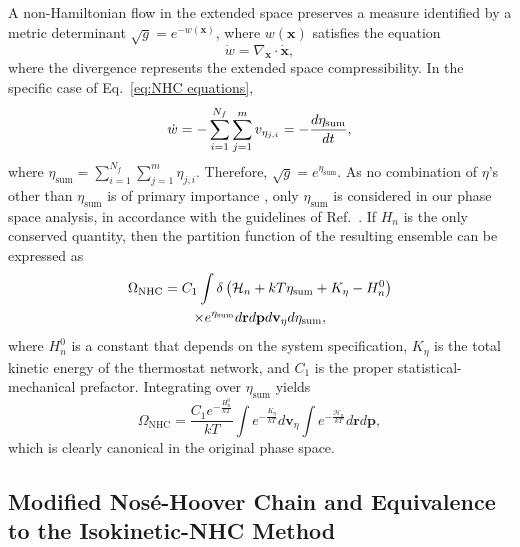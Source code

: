 \documentclass[
aip,
jcp,
reprint,
]{revtex4-1}
\newcommand{\vt}[1]{\boldsymbol{\mathbf{#1}}}          %
\begin{document}
A non-Hamiltonian flow in the extended space preserves a measure identified by a metric determinant $\sqrt{g} = e^{-w(\vt x)}$, where $w(\vt x)$ satisfies the equation \cite{Tuckerman_1999, Tuckerman_2001}
\begin{equation}
\label{eq:extended space compressibility}
\dot{w} = \nabla_{\vt x} \cdot \dot{\vt x},
\end{equation}
where the divergence represents the extended space compressibility.
In the specific case of Eq.~\eqref{eq:NHC equations},
\begin{equation}
\dot{w} = -\sum_{i=1}^{N_f} \sum_{j=1}^m v_{\eta_{j,i}} = -\frac{d\eta_{\rm sum}}{dt},
\end{equation}
where $\eta_\mathrm{sum} = \sum_{i=1}^{N_f} \sum_{j=1}^m \eta_{j,i}$.
Therefore, $\sqrt{g} = e^{\eta_\mathrm{sum}}$.
As no combination of $\eta$'s other than $\eta_\mathrm{sum}$ is of primary importance \cite{Tuckerman_2001}, only $\eta_\mathrm{sum}$ is considered in our phase space analysis, in accordance with the guidelines of Ref.~.
If $H_n$ is the only conserved quantity, then the partition function of the resulting ensemble can be expressed as
\begin{multline}
\label{eq:NHC defined partition function}
\Omega_\mathrm{NHC} = C_1 \int \delta\left(\mathcal{H}_n + kT\eta_{\rm sum} + K_\eta - H_n^0\right) \\
\times e^{\eta_{\rm sum}}  d{\vt r} d{\vt p} d{\vt v}_\eta d\eta_{\rm sum},
\end{multline}
where $H_n^0$ is a constant that depends on the system specification,
$K_\eta$ is the total kinetic energy of the thermostat network,
and $C_1$ is the proper statistical-mechanical prefactor.
Integrating over $\eta_\mathrm{sum}$ yields
\begin{equation}
\label{eq:NHC partition function}
\Omega_\mathrm{NHC} = \frac{C_1 e^{-\frac{H_n^0}{kT}}}{kT} \int e^{-\frac{K_\eta}{kT}} d{\vt v}_\eta \int e^{-\frac{\mathcal{H}_n}{kT}}  d{\vt r} d{\vt p} ,
\end{equation}
which is clearly canonical in the original phase space.

\subsection{Modified Nos\'{e}-Hoover Chain and Equivalence to the Isokinetic-NHC Method}
\label{sec:modified NHC thermostatting}

\end{document}
